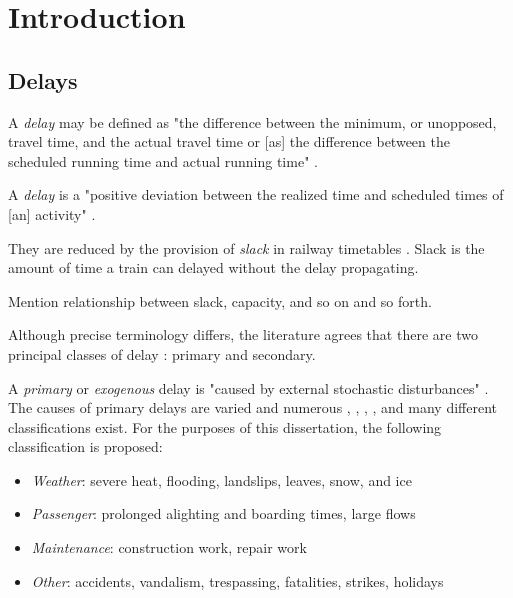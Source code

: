 \documentclass{article}
\begin{document}
\section{Introduction}

\subsection{Delays}

A \textit{delay} may be defined as "the difference between the minimum, or unopposed, travel time, and the actual travel time or [as] the difference between the scheduled running time and actual running time" \cite{dingler_koening_sam_christopher_2010}.

A \textit{delay} is a "positive deviation between the realized time and scheduled times of [an] activity" \cite{cerreto_nielsen_harrod_nielsen_2016}. 

They are reduced by the provision of  \textit{slack} in railway timetables \cite{cerreto_nielsen_harrod_nielsen_2016}. Slack is the amount of time a train can delayed without the delay propagating. 

Mention relationship between slack, capacity, and so on and so forth.

Although precise terminology differs, the literature agrees that there are two principal classes of delay \cite{olsson_haugland_2004}: primary and secondary.

A \textit{primary} or \textit{exogenous} delay is "caused by external stochastic disturbances" \cite{oneto_fumeo_clerico_canepa_papa_dambra_mazzino_anguita_2016}. The causes of primary delays are varied and numerous \cite{berger_et_al_2011}, \cite{milinkovic_markovic_veskovic_ivic_pavlovic_2013}, \cite{nr_delay_causes}, \cite{cerreto_nielsen_harrod_nielsen_2016}, and many different classifications exist. For the purposes of this dissertation, the following classification is proposed:

\begin{itemize}
	\item \textit{Weather}: severe heat, flooding, landslips, leaves, snow, and ice
	\item \textit{Passenger}: prolonged alighting and boarding times, large flows
	\item \textit{Maintenance}: construction work, repair work
	\item \textit{Other}: accidents, vandalism, trespassing, fatalities, strikes, holidays
\end{itemize}
\end{document}
